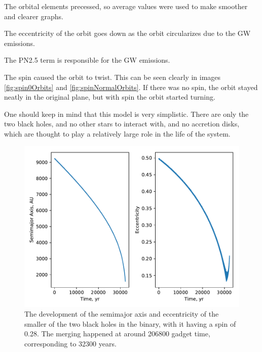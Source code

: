 \documentclass[english, oneside]{HYgradu}
\begin{document}
The orbital elements precessed, so average values were used to make smoother and clearer graphs. 

The eccentricity of the orbit goes down as the orbit circularizes due to the GW emissions.

The PN2.5 term is responsible for the GW emissions.

The spin caused the orbit to twist. This can be seen clearly in images \ref{fig:spin0Orbits} and \ref{fig:spinNormalOrbits}. If there was no spin, the orbit stayed neatly in the original plane, but with spin the orbit started turning.

One should keep in mind that this model is very simplistic. There are only the two black holes, and no other stars to interact with, and no accretion disks, which are thought to play a relatively large role in the life of the system.

\begin{figure}[h!tb]
\centering
\includegraphics[width=\textwidth]{../images/spinNormal.pdf}
\caption{The development of the semimajor axis and eccentricity of the smaller of the two black holes in the binary, with it having a spin of 0.28. The merging happened at around 206800 gadget time, corresponding to 32300 years.}
\label{fig:spinNormal}
\end{figure}
\end{document}
